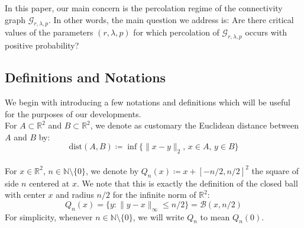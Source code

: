 \documentclass[10pt,a4paper]{amsart}
\theoremstyle{exampstyle}
\newtheorem{Remark}{Remark}
\theoremstyle{exampnotations}
\begin{document}

\indent In this paper, our main concern is the percolation regime of the connectivity graph $\mathcal{G}_{r,\lambda, p}$. In other words, the main question we address is: Are there critical values of the parameters $(r,\lambda,p)$ for which percolation of $\mathcal{G}_{r,\lambda, p}$ occurs with positive probability?


\subsection{Definitions and Notations}
We begin with introducing a few notations and definitions which will be useful for the purposes of our developments. \\


\indent For $A \subset \mathbb{R}^{2}$ and $B \subset \mathbb{R}^{2}$, we denote as customary the Euclidean distance between $A$ and $B$ by:
 $$\text{dist}(A,B) \coloneqq \inf \lbrace \lVert x - y \rVert_{2} , \,  x \in A, \,  y \in B \rbrace$$
\\

\indent For $x \in \mathbb{R}^{2}$, $n \in \mathbb{N} \setminus \lbrace 0 \rbrace$, we denote by $Q_n(x) \coloneqq x + \left[-n/2,n/2\right]^{2}$ the square of side $n$ centered at $x$. We note that this is exactly the definition of the closed ball with center $x$ and radius $n/2$ for the infinite norm of $\mathbb{R}^2$:
\begin{equation*}
    Q_n(x) = \lbrace y : \lVert y-x \rVert_{\infty} \leq n/2 \rbrace = \mathscr{B}(x,n/2)
\end{equation*}
For simplicity, whenever $n \in \mathbb{N} \setminus \lbrace 0 \rbrace$, we will write $Q_n$ to mean $Q_n(0)$. \\
\end{document}
